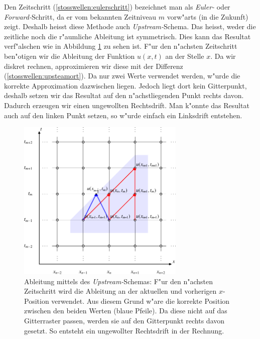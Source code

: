 \begin{refsection}
Den Zeitschritt (\ref{stosswellen:eulerschritt}) bezeichnet man als
\textit{Euler-} oder \textit{Forward-}Schritt, da er vom bekannten
Zeitniveau $m$ vorw"arts (in die Zukunft) zeigt. Deshalb heisst diese
Methode auch \textit{Upstream-}Schema. Das heisst, weder die zeitliche
noch die r"aumliche Ableitung ist symmetrisch. Dies kann das Resultat
verf"alschen wie in Abbildung \ref{stosswellen:eulerableitung} zu sehen
ist. F"ur den n"achsten Zeitschritt ben"otigen wir die Ableitung der
Funktion $u(x,t)$ an der Stelle $x$. Da wir diskret rechnen, approximieren
wir diese mit der Differenz (\ref{stosswellen:upsteamort}). Da nur zwei
Werte verwendet werden, w"urde die korrekte Approximation dazwischen
liegen. Jedoch liegt dort kein Gitterpunkt, deshalb setzen wir das
Resultat auf den n"achstliegenden Punkt rechts davon. Dadurch erzeugen
wir einen ungewollten Rechtsdrift. Man k"onnte das Resultat auch auf
den linken Punkt setzen, so w"urde einfach ein Linksdrift entstehen.

\begin{figure}[h]
\begin{center}
	\includegraphics[width=8cm]{stosswellen/stoss-2.pdf}
\end{center}
\caption{Ableitung mittels des \textit{Upstream-}Schemas: F"ur
den n"achsten Zeitschritt wird die Ableitung an der aktuellen und
vorherigen $x$-Position verwendet. Aus diesem Grund w"are die korrekte
Position zwischen den beiden Werten (blaue Pfeile). Da diese nicht auf
das Gitterraster passen, werden sie auf den Gitterpunkt rechts davon
gesetzt. So entsteht ein ungewollter Rechtsdrift in der Rechnung.
\label{stosswellen:eulerableitung}}
\end{figure}



\end{refsection}
